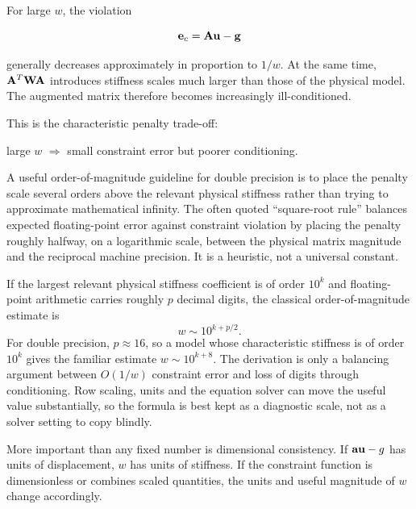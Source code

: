 For large $w$, the violation

\begin{equation}
    \mathbf{e}_c=\mathbf{A}\mathbf{u}-\mathbf{g}
\end{equation}

generally decreases approximately in proportion to $1/w$. At the same time,
$\mathbf{A}^T\mathbf{W}\mathbf{A}$ introduces stiffness scales much larger than those of the
physical model. The augmented matrix therefore becomes increasingly
ill-conditioned.

This is the characteristic penalty trade-off:

\begin{center}
large $w$ $\Rightarrow$ small constraint error but poorer conditioning.
\end{center}

A useful order-of-magnitude guideline for double precision is to place the
penalty scale several orders above the relevant physical stiffness rather than
trying to approximate mathematical infinity. The often quoted ``square-root
rule'' balances expected floating-point error against constraint violation by
placing the penalty roughly halfway, on a logarithmic scale, between the
physical matrix magnitude and the reciprocal machine precision. It is a
heuristic, not a universal constant.


\begin{notebooknote}
If the largest relevant physical stiffness coefficient is of order $10^k$ and
floating-point arithmetic carries roughly $p$ decimal digits, the classical
order-of-magnitude estimate is
\begin{equation*}
    w\sim10^{k+p/2}.
\end{equation*}
For double precision, $p\approx16$, so a model whose characteristic stiffness is
of order $10^k$ gives the familiar estimate $w\sim10^{k+8}$. The derivation is
only a balancing argument between $O(1/w)$ constraint error and loss of digits
through conditioning. Row scaling, units and the equation solver can move the
useful value substantially, so the formula is best kept as a diagnostic scale,
not as a solver setting to copy blindly.
\end{notebooknote}

More important than any fixed number is dimensional consistency. If
$\mathbf{a}\mathbf{u}-g$ has units of displacement, $w$ has units of stiffness. If the
constraint function is dimensionless or combines scaled quantities, the units
and useful magnitude of $w$ change accordingly.

